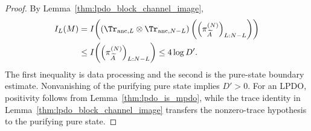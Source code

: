 \begin{proof}\leanok
    By Lemma~\ref{thm:lpdo_block_channel_image},
    \begin{align}
        I_L(M)
         & =I\!\left((\Tr_{\mathrm{anc},L}\otimes
        \Tr_{\mathrm{anc},N-L})
        \left(\left(\pi_{\widetilde A}^{(N)}\right)_{L:N-L}\right)\right)
        \notag                                                                \\
         & \leq I\!\left(\left(\pi_{\widetilde A}^{(N)}\right)_{L:N-L}\right)
        \leq4\log D'.
        \notag
    \end{align}
    The first inequality is data processing and the second is the pure-state
    boundary estimate. Nonvanishing of the purifying pure state implies
    $D'>0$. For an LPDO, positivity follows from
    Lemma~\ref{thm:lpdo_is_mpdo}, while the trace identity in
    Lemma~\ref{thm:lpdo_block_channel_image} transfers the nonzero-trace
    hypothesis to the purifying pure state.
\end{proof}
